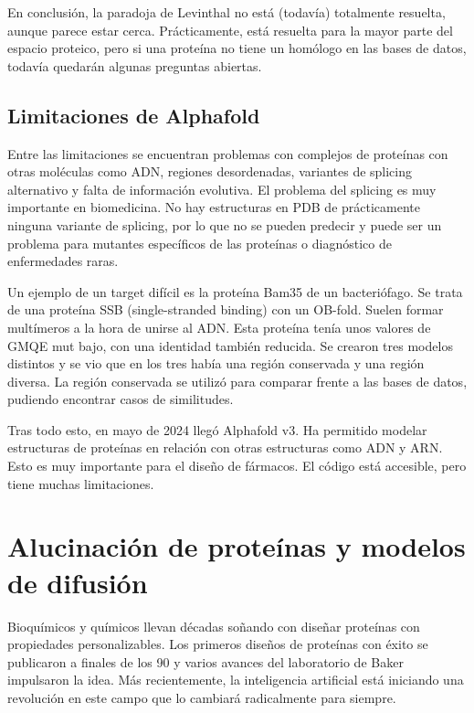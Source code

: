 En conclusión, la paradoja de Levinthal no está (todavía) totalmente resuelta, aunque parece estar cerca. Prácticamente, está resuelta para la mayor parte del espacio proteico, pero si una proteína no tiene un homólogo en las bases de datos, todavía quedarán algunas preguntas abiertas.

\subsection{Limitaciones de Alphafold}
Entre las limitaciones se encuentran problemas con complejos de proteínas con otras moléculas como ADN, regiones desordenadas, variantes de splicing alternativo y falta de información evolutiva. El problema del splicing es muy importante en biomedicina. No hay estructuras en PDB de prácticamente ninguna variante de splicing, por lo que no se pueden predecir y puede ser un problema para mutantes específicos de las proteínas o diagnóstico de enfermedades raras. 

Un ejemplo de un target difícil es la proteína Bam35 de un bacteriófago. Se trata de una proteína SSB (single-stranded binding) con un OB-fold. Suelen formar multímeros a la hora de unirse al ADN. Esta proteína tenía unos valores de GMQE mut bajo, con una identidad también reducida. Se crearon tres modelos distintos y se vio que en los tres había una región conservada y una región diversa. La región conservada se utilizó para comparar frente a las bases de datos, pudiendo encontrar casos de similitudes. 

Tras todo esto, en mayo de 2024 llegó Alphafold v3. Ha permitido modelar estructuras de proteínas en relación con otras estructuras como ADN y ARN. Esto es muy importante para el diseño de fármacos. El código está accesible, pero tiene muchas limitaciones. 

\section{Alucinación de proteínas y modelos de difusión}
Bioquímicos y químicos llevan décadas soñando con diseñar proteínas con propiedades personalizables. Los primeros diseños de proteínas con éxito se publicaron a finales de los 90 y varios avances del laboratorio de Baker impulsaron la idea. Más recientemente, la inteligencia artificial está iniciando una revolución en este campo que lo cambiará radicalmente para siempre.

